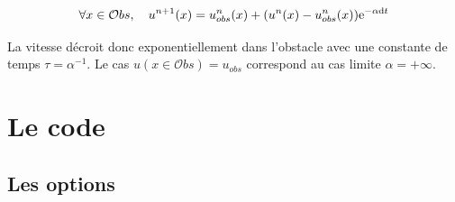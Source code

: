 		\begin{equation}
			\forall x \in \mathcal{O}bs, \ \ \
			u^{n+1}(x)= u^n_{obs}(x) + (u^n(x)-u^n_{obs}(x))\mathrm{e}^{-\alpha\mathrm{d}t}
			\label{penalisation}
		\end{equation}
		
		La vitesse décroit donc exponentiellement dans l'obstacle avec une constante de temps $\tau= \alpha^{-1}$. Le cas $u(x\in \mathcal{O}bs)=u_{obs}$ correspond au cas limite $\alpha = +\infty$.


\section{Le code}

	\subsection{Les options}
		
